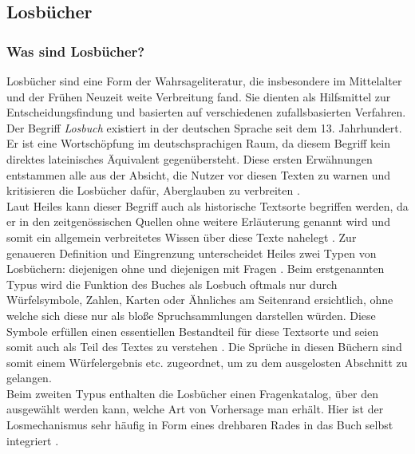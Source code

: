 \documentclass[12pt,a4paper]{article}
\begin{document}
	
	\subsection{Losbücher}
		\subsubsection{Was sind Losbücher?}
		Losbücher sind eine Form der Wahrsageliteratur, die insbesondere im Mittelalter und der Frühen Neuzeit weite Verbreitung fand. Sie dienten als Hilfsmittel zur Entscheidungsfindung und basierten auf 
		verschiedenen zufallsbasierten Verfahren. 
		Der Begriff \textit{Losbuch} existiert in der deutschen Sprache seit dem 13. Jahrhundert. Er ist eine Wortschöpfung im deutschsprachigen Raum, da diesem Begriff kein 
		direktes lateinisches Äquivalent gegenübersteht. Diese ersten Erwähnungen entstammen alle aus der Absicht, die Nutzer vor diesen Texten zu warnen und kritisieren die 
		Losbücher dafür, Aberglauben zu verbreiten \parencite[S.~23 f.]{heiles}.\\
		Laut Heiles kann dieser Begriff auch als historische Textsorte begriffen werden, da er in den zeitgenössischen Quellen ohne weitere Erläuterung genannt wird und 
		somit ein allgemein verbreitetes Wissen über diese Texte nahelegt \parencite[S.~26]{heiles}.
		Zur genaueren Definition und Eingrenzung unterscheidet Heiles zwei Typen von Losbüchern: diejenigen ohne und diejenigen mit Fragen \parencite[S.~39]{heiles}. Beim 
		erstgenannten Typus wird die Funktion des Buches als Losbuch oftmals nur durch Würfelsymbole, Zahlen, Karten oder Ähnliches am Seitenrand ersichtlich, ohne welche 
		sich diese nur als bloße Spruchsammlungen darstellen würden. Diese Symbole erfüllen einen essentiellen Bestandteil für diese Textsorte und seien somit auch als Teil des Textes 
		zu verstehen \parencite[S.~46]{heiles}. Die Sprüche in diesen Büchern sind somit einem Würfelergebnis etc. zugeordnet, um zu dem ausgelosten Abschnitt zu gelangen.\\
		Beim zweiten Typus enthalten die Losbücher einen Fragenkatalog, über den ausgewählt werden kann, welche Art von Vorhersage man erhält. Hier ist der Losmechanismus sehr 
		häufig in Form eines drehbaren Rades in das Buch selbst integriert \parencite[S.~56]{heiles}.
\end{document}
